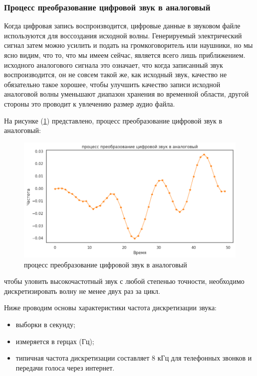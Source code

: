 \subsubsection{Процесс преобразование цифровой звук в аналоговый}

Когда цифровая запись воспроизводится, цифровые данные в звуковом файле используются для воссоздания исходной волны. Генерируемый электрический сигнал затем можно усилить и подать на громкоговоритель или наушники, но мы ясно видим, что то, что мы имеем сейчас, является всего лишь приближением. исходного аналогового сигнала это означает, что когда записанный звук воспроизводится, он не совсем такой же, как исходный звук, качество не обязательно такое хорошее, чтобы улучшить качество записи исходной аналоговой волны уменьшают диапазон хранения во временной области, другой стороны это проводит к увлечению размер аудио файла.

На рисунке (\ref{fig:ampl_and_time}) представлено, процесс преобразование цифровой звук в аналоговый: 
\begin{figure}[H]
	\centering
	\includegraphics[width=0.8\linewidth]{images/regenration_of_audio.png}
	\caption{процесс преобразование цифровой звук в аналоговый}
	\label{fig:ampl_and_time}
\end{figure}

чтобы уловить высокочастотный звук с любой степенью точности, необходимо дискретизировать волну не менее двух раз за цикл.

Ниже проводим основы характеристики частота дискретизации звука:

\begin{itemize}
    \item выборки в секунду;
    \item измеряется в герцах (Гц);
    \item типичная частота дискретизации составляет 8 кГц для телефонных звонков и передачи голоса через интернет.
\end{itemize}

